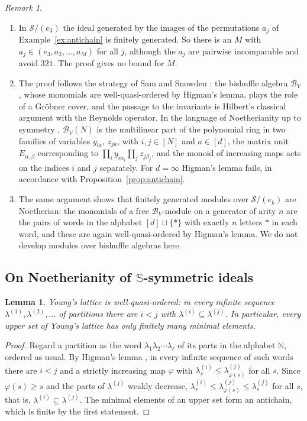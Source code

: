\documentclass[11pt]{amsart}
\newtheorem{lemma}[theorem]{Lemma}
\theoremstyle{definition}
\theoremstyle{remark}
\newtheorem{remark}[theorem]{Remark}
\newcommand{\cB}{\mathcal{B}}
\newcommand{\cS}{\mathscr{S}}
\begin{document}
\begin{remark}\label{rem:noeth-ek}
\begin{enumerate}
\item In $\cS/(e_3)$ the ideal generated by the images of the permutations $a_j$ of Example~\ref{ex:antichain} is finitely generated. So there is an $M$ with $a_j\in(e_3,a_2,\dots,a_M)$ for all $j$, although the $a_j$ are pairwise incomparable and avoid $321$. The proof gives no bound for $M$.
\item The proof follows the strategy of Sam and Snowden \cite{SS}: the bishuffle algebra $\cB_V$, whose monomials are well-quasi-ordered by Higman's lemma, plays the role of a Gr\"obner cover, and the passage to the invariants is Hilbert's classical argument with the Reynolds operator. In the language of Noetherianity up to symmetry \cite{HS}, $\cB_V(N)$ is the multilinear part of the polynomial ring in two families of variables $y_{ia}$, $z_{ja}$, with $i,j\in[N]$ and $a\in[d]$, the matrix unit $E_{\alpha,\beta}$ corresponding to $\prod_iy_{i\alpha_i}\prod_jz_{j\beta_j}$, and the monoid of increasing maps acts on the indices $i$ and $j$ separately. For $d=\infty$ Higman's lemma fails, in accordance with Proposition~\ref{prop:antichain}.
\item The same argument shows that finitely generated modules over $\cS/(e_k)$ are Noetherian: the monomials of a free $\cB_V$-module on a generator of arity $n$ are the pairs of words in the alphabet $[d]\sqcup\{\ast\}$ with exactly $n$ letters $\ast$ in each word, and these are again well-quasi-ordered by Higman's lemma. We do not develop modules over bishuffle algebras here.
\end{enumerate}
\end{remark}

\subsection{On Noetherianity of $\mathbb{S}$-symmetric ideals}

\begin{lemma}\label{lem:young-wqo}
	Young's lattice is well-quasi-ordered: in every infinite sequence $\lambda^{(1)},\lambda^{(2)},\dots$ of partitions there are $i<j$ with $\lambda^{(i)}\subseteq\lambda^{(j)}$. In particular, every upper set of Young's lattice has only finitely many minimal elements.
\end{lemma}

\begin{proof}
	Regard a partition as the word $\lambda_1\lambda_2\cdots\lambda_\ell$ of its parts in the alphabet $\mathbb N$, ordered as usual. By Higman's lemma \cite{Higman}, in every infinite sequence of such words there are $i<j$ and a strictly increasing map $\varphi$ with $\lambda^{(i)}_s\le\lambda^{(j)}_{\varphi(s)}$ for all $s$. Since $\varphi(s)\ge s$ and the parts of $\lambda^{(j)}$ weakly decrease, $\lambda^{(i)}_s\le\lambda^{(j)}_{\varphi(s)}\le\lambda^{(j)}_s$ for all $s$, that is, $\lambda^{(i)}\subseteq\lambda^{(j)}$. The minimal elements of an upper set form an antichain, which is finite by the first statement.
\end{proof}
\end{document}
